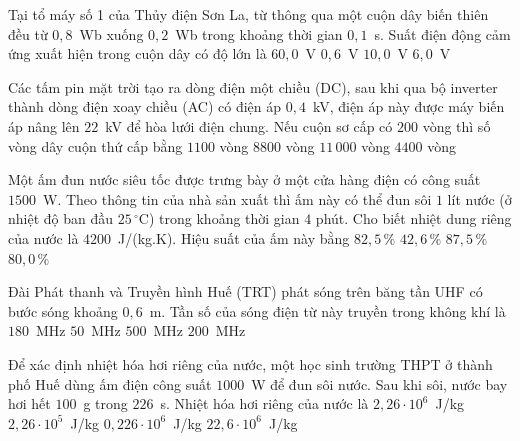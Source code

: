 	\begin{ex}%
		Tại tổ máy số 1 của Thủy điện Sơn La, từ thông qua một cuộn dây biến thiên đều từ $0{,}8$~Wb xuống $0{,}2$~Wb trong khoảng thời gian $0{,}1$~s. Suất điện động cảm ứng xuất hiện trong cuộn dây có độ lớn là
		\choice
		{$60{,}0$~V}
		{$0{,}6$~V}
		{$10{,}0$~V}
		{\True $6{,}0$~V}
	\end{ex}

	\begin{ex}%
		Các tấm pin mặt trời tạo ra dòng điện một chiều (DC), sau khi qua bộ inverter thành dòng điện xoay chiều (AC) có điện áp $0{,}4$~kV, điện áp này được máy biến áp nâng lên $22$~kV để hòa lưới điện chung. Nếu cuộn sơ cấp có $200$ vòng thì số vòng dây cuộn thứ cấp bằng
		\choice
		{$1100$ vòng}
		{$8800$ vòng}
		{\True $11\,000$ vòng}
		{$4400$ vòng}
	\end{ex}

	\begin{ex}%
		Một ấm đun nước siêu tốc được trưng bày ở một cửa hàng điện có công suất $1500$~W. Theo thông tin của nhà sản xuất thì ấm này có thể đun sôi $1$ lít nước (ở nhiệt độ ban đầu $25\,^\circ\text{C}$) trong khoảng thời gian $4$ phút. Cho biết nhiệt dung riêng của nước là $4200$~J/(kg.K). Hiệu suất của ấm này bằng
		\choice
		{$82{,}5\,\%$}
		{$42{,}6\,\%$}
		{\True $87{,}5\,\%$}
		{$80{,}0\,\%$}
	\end{ex}

	\begin{ex}%
		Đài Phát thanh và Truyền hình Huế (TRT) phát sóng trên băng tần UHF có bước sóng khoảng $0{,}6$~m. Tần số của sóng điện từ này truyền trong không khí là
		\choice
		{$180$~MHz}
		{$50$~MHz}
		{\True $500$~MHz}
		{$200$~MHz}
	\end{ex}

	\begin{ex}%
		Để xác định nhiệt hóa hơi riêng của nước, một học sinh trường THPT ở thành phố Huế dùng ấm điện công suất $1000$~W để đun sôi nước. Sau khi sôi, nước bay hơi hết $100$~g trong $226$~s. Nhiệt hóa hơi riêng của nước là
		\choice
		{\True $2{,}26\cdot 10^6$~J/kg}
		{$2{,}26\cdot 10^5$~J/kg}
		{$0{,}226\cdot 10^6$~J/kg}
		{$22{,}6\cdot 10^6$~J/kg}
	\end{ex}

